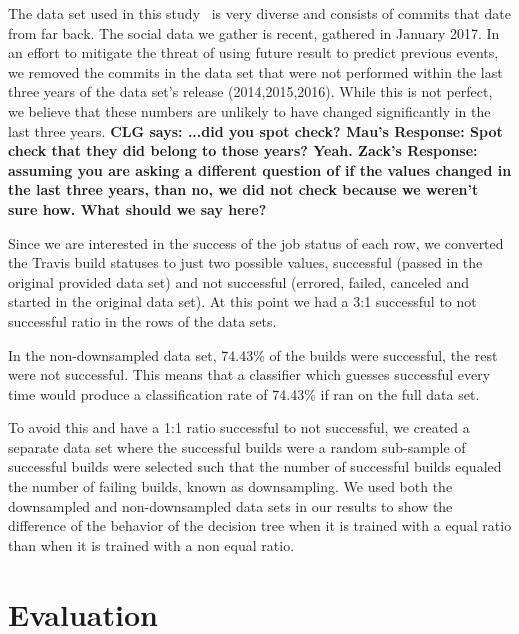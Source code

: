 \documentclass[10pt, conference]{IEEEtran}
\newcommand{\clg}[1]
  {{\scriptsize \textbf{\color{blue} {CLG says: #1}}}}
\begin{document}
The data set used in this study~\cite{msr17challenge} is very diverse 
and consists of commits that date from far back. The social data we 
gather is recent, gathered in January 2017. In an effort to mitigate the threat of
using future result to predict previous events,
we removed the commits in the data set that were not performed within the last
three years of the data set's release (2014,2015,2016).  While this is not
perfect, we believe that these numbers are unlikely to have changed
significantly in the last three years.\clg{...did you spot check? Mau's Response: Spot
check that they did belong to those years? Yeah. Zack's Response: assuming you
are asking a different question of if the values changed in the last three
years, than no, we did not check because we weren't sure how.  What should we
say here?}

Since we are interested in the success of the job status of each row, we 
converted the Travis build statuses to just two possible values,
successful (passed in the original provided data set) and not successful 
(errored, failed, canceled
and started in the original data set). At this point we had a 3:1 successful to 
not successful ratio in the rows of the data sets. 

In the non-downsampled data set, 74.43\% of the builds were successful, the rest were not
successful.  This means that a classifier which guesses successful every time
would produce a classification rate of 74.43\% if ran on the full data
set. 

To avoid this and have a 1:1 ratio successful to not successful, we created a 
separate data set where the
successful builds were a random sub-sample of successful builds were selected
such that the number of successful builds equaled the number of failing builds,
known as downsampling.  We used 
both the downsampled and non-downsampled data sets in our results to show the 
difference of the behavior of the decision tree when it is trained with a equal 
ratio than when it is trained with a non equal ratio.


\section{Evaluation}
\end{document}
